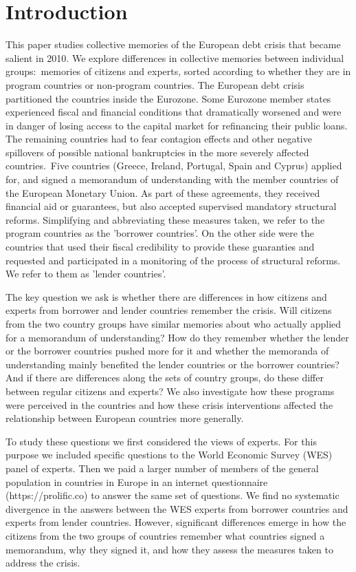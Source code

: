 \section{Introduction}

This paper studies collective memories of the European debt crisis that
became salient in 2010. We explore differences in collective
memories between individual groups:\ memories of citizens and experts, sorted
according to whether they are in program countries or non-program countries.
The European debt crisis partitioned the countries inside the Eurozone. Some
Eurozone member states experienced fiscal and financial conditions that
dramatically worsened and were in danger of losing access to the capital
market for refinancing their public loans. The remaining countries had to
fear contagion effects and other negative spillovers of possible national
bankruptcies in the more severely affected countries.\ Five countries
(Greece, Ireland, Portugal, Spain and Cyprus) applied for, and signed a
memorandum of understanding with the member countries of the European
Monetary Union. As part of these agreements, they received financial aid or
guarantees, but also accepted supervised mandatory structural reforms.
Simplifying and abbreviating these measures taken, we refer to the program
countries as the 'borrower countries'. On the other side were the countries
that used their fiscal credibility to provide these guaranties and requested
and participated in a monitoring of the process of structural reforms. We
refer to them as 'lender countries'.

The key question we ask is whether there are differences in how
citizens and experts from borrower and lender countries remember the crisis.
Will citizens from the two country groups have similar memories about who
actually applied for a memorandum of understanding? How do they remember
whether the lender or the borrower countries pushed more for it and whether
the memoranda of understanding mainly benefited the lender countries or the
borrower countries? And if there are differences along the sets of country
groups, do these differ between regular citizens and experts? We also
investigate how these programs were perceived in the countries
and how these crisis interventions affected the relationship between European
countries more generally.\ 

To study these questions we first considered the
views of experts. For this purpose we included specific questions to the
World Economic Survey (WES) panel of experts. Then we paid a larger number
of members of the general population in countries in Europe in an internet
questionnaire (https://prolific.co) to answer the same set of questions. We
find no systematic divergence in the answers between the WES experts from
borrower countries and experts from lender countries. However, significant
differences emerge in how the citizens from the two groups of countries
remember what countries signed a memorandum, why they signed it, and how
they assess the measures taken to address the crisis.

